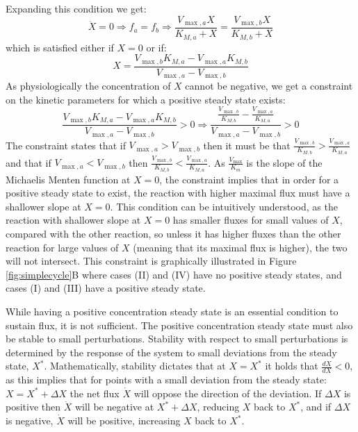 \documentclass[a4page,notitlepage]{article}
\begin{document}
    Expanding this condition we get:
    \begin{equation*}
      \dot X = 0 \Rightarrow f_a = f_b \Rightarrow \frac{V_{\max,a}X}{K_{M,a}+X}=\frac{V_{\max,b}X}{K_{M,b}+X}
    \end{equation*}
    which is satisfied either if $X=0$ or if:
    \begin{equation}
      \label{eq:xstst}
      X=\frac{V_{\max,b}K_{M,a}-V_{\max,a}K_{M,b}}{V_{\max,a}-V_{\max,b}}
    \end{equation}
    As physiologically the concentration of $X$ cannot be negative, we get a constraint on the kinetic parameters for which a positive steady state exists:
    \begin{equation*}
      \frac{V_{\max,b}K_{M,a}-V_{\max,a}K_{M,b}}{V_{\max,a}-V_{\max,b}}>0 \Rightarrow \frac{\frac{V_{\max,b}}{K_{M,b}}-\frac{V_{\max,a}}{K_{M,a}}}{V_{\max,a}-V_{\max,b}}>0
    \end{equation*}
    The constraint states that if $V_{\max,a}>V_{\max,b}$ then it must be that $\frac{V_{\max,b}}{K_{M,b}}>\frac{V_{\max,a}}{K_{M,a}}$ and that if $V_{\max,a}<V_{\max,b}$ then $\frac{V_{\max,b}}{K_{M,b}}<\frac{V_{\max,a}}{K_{M,a}}$.
    As $\frac{V_{\max}}{K_m}$ is the slope of the Michaelis Menten function at $X=0$, the constraint implies that in order for a positive steady state to exist, the reaction with higher maximal flux must have a shallower slope at $X=0$.
    This condition can be intuitively understood, as the reaction with shallower slope at $X=0$ has smaller fluxes for small values of $X$, compared with the other reaction, so unless it has higher fluxes than the other reaction for large values of $X$ (meaning that its maximal flux is higher), the two will not intersect.
    This constraint is graphically illustrated in Figure \ref{fig:simplecycle}B where cases (II) and (IV) have no positive steady states, and cases (I) and (III) have a positive steady state.

    While having a positive concentration steady state is an essential condition to sustain flux, it is not sufficient.
    The positive concentration steady state must also be stable to small perturbations.
    Stability with respect to small perturbations is determined by the response of the system to small deviations from the steady state, $X^*$.
    Mathematically, stability dictates that at $X=X^*$ it holds that $\frac{d\dot X}{dX} <0$, as this  implies that for points with a small deviation from the steady state: $X = X^*+\Delta X$ the net flux $\dot X$ will oppose the direction of the deviation.
    If $\Delta X$ is positive then $\dot X$ will be negative at $X^*+\Delta X$, reducing $X$ back to $X^*$, and if $\Delta X$ is negative, $\dot X$ will be positive, increasing $X$ back to $X^*$.
\end{document}
